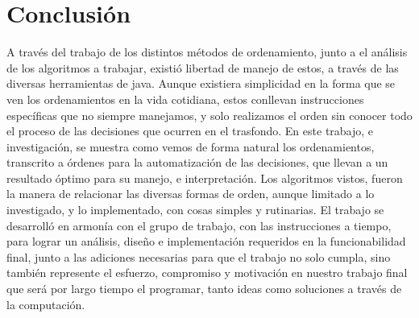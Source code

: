 \documentclass[12pt,letterpaper]{article}
\begin{document}
\section{Conclusión}
\vskip 0.4cm
A través del trabajo de los distintos métodos de ordenamiento, junto a el análisis de los algoritmos a trabajar, existió libertad de manejo de estos, a través de las diversas herramientas de java. Aunque existiera simplicidad en la forma que se ven los ordenamientos en la vida cotidiana, estos conllevan instrucciones específicas que no siempre manejamos, y solo realizamos el orden sin conocer todo el proceso de las decisiones que ocurren en el trasfondo. En este trabajo, e investigación, se muestra como vemos de forma natural los ordenamientos, transcrito a órdenes para la automatización de las decisiones, que llevan a un resultado óptimo para su manejo, e interpretación. Los algoritmos vistos, fueron la manera de relacionar las diversas formas de orden, aunque limitado a lo investigado, y lo implementado, con cosas simples y rutinarias. El trabajo se desarrolló en armonía con el grupo de trabajo, con las instrucciones a tiempo, para lograr un análisis, diseño e implementación requeridos en la funcionabilidad final, junto a las adiciones necesarias para que el trabajo no solo cumpla, sino también represente el esfuerzo, compromiso y motivación en nuestro trabajo final que será por largo tiempo el programar, tanto ideas como soluciones a través de la computación. 
\vskip 0.4cm
\newpage
\begin{thebibliography}{10}
\end{thebibliography}
\end{document}
